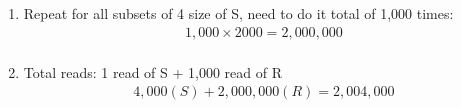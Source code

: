 \documentclass[12pt]{extarticle}
\begin{document}
\begin{flushleft}
\begin{enumerate}
\begin{enumerate}
\item Repeat for all subsets of 4 size of S, need to do it total of 1,000 times:
\begin{align*}
    1,000 \times 2000 = 2,000,000 \\
\end{align*}

\item Total reads: 1 read of S + 1,000 read of R\\
\begin{align*}
    4,000 (S) + 2,000,000 (R) = \boxed{2,004,000}
\end{align*}
\end{enumerate}

\end{enumerate}
\end{flushleft}
\end{document}
